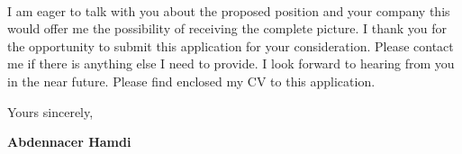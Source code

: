 \documentclass[11pt]{letter}
\begin{document}
~\par I am eager to talk with you about the proposed position and your company this would offer me the possibility of receiving the complete picture. I thank you for the opportunity to submit this application for your consideration. Please contact me if there is anything else I need to provide. I look forward to hearing from you in the near future. Please find enclosed my CV to this application.

\noindent Yours sincerely,

\begin{flushleft}
 {\bfseries Abdennacer Hamdi}
 \end{flushleft}
 \vfill
 
\end{document}
